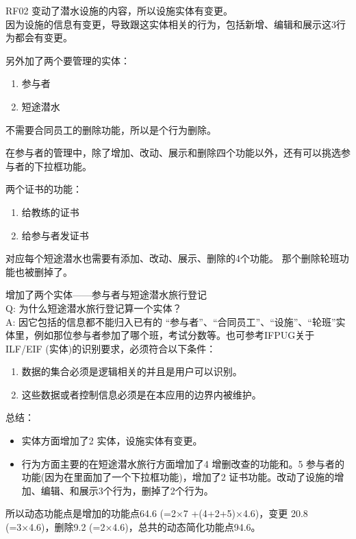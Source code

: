 RF02 变动了潜水设施的内容，所以设施实体有变更。\\
因为设施的信息有变更，导致跟这实体相关的行为，包括新增、编辑和展示这3行为都会有变更。

另外加了两个要管理的实体：

\begin{enumerate}
\tightlist
\item
  参与者
\item
  短途潜水
\end{enumerate}

不需要合同员工的删除功能，所以是个行为删除。

在参与者的管理中，除了增加、改动、展示和删除四个功能以外，还有可以挑选参与者的下拉框功能。

两个证书的功能：

\begin{enumerate}
\tightlist
\item
  给教练的证书
\item
  给参与者发证书
\end{enumerate}

对应每个短途潜水也需要有添加、改动、展示、删除的4个功能。
那个删除轮班功能也被删掉了。

增加了两个实体------参与者与短途潜水旅行登记\\
Q: 为什么短途潜水旅行登记算一个实体？\\
A: 因它包括的信息都不能归入已有的
``参与者''、``合同员工''、``设施''、``轮班''实体里，例如那位参与者参加了哪个班，考试分数等。也可参考IFPUG关于ILF/EIF
(实体)的识别要求，必须符合以下条件：

\begin{enumerate}
\tightlist
\item
  数据的集合必须是逻辑相关的并且是用户可以识别。
\item
  这些数据或者控制信息必须是在本应用的边界内被维护。
\end{enumerate}

总结：

\begin{itemize}
\tightlist
\item
  实体方面增加了2 实体，设施实体有变更。
\item
  行为方面主要的在短途潜水旅行方面增加了4 增删改查的功能和。5
  参与者的功能(因为在里面加了一个下拉框功能)，增加了2
  证书功能。改动了设施的增加、编辑、和展示3个行为，删掉了2个行为。
\end{itemize}

所以动态功能点是增加的功能点64.6 (=2×7 +(4+2+5)×4.6)，变更 20.8
(=3×4.6)，删除9.2 (=2×4.6)，总共的动态简化功能点94.6。

